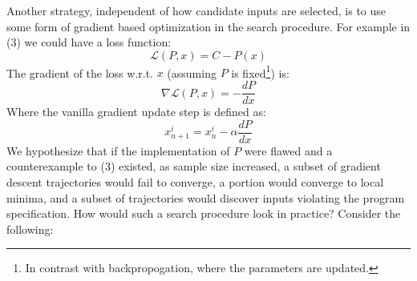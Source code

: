 \documentclass[12pt,initial,twoside,maitrise]{dms}
\numberwithin{equation}{section}
\numberwithin{table}{chapter}
\numberwithin{figure}{chapter}
\begin{document}
    Another strategy, independent of how candidate inputs are selected, is to use some form of gradient based optimization in the search procedure. For example in (3) we could have a loss function:
    \begin{equation}
        \mathcal{L}(P, x) = C - P(x)
    \end{equation}
    The gradient of the loss w.r.t. $x$ (assuming $P$ is fixed\footnote{In contrast with backpropogation, where the parameters are updated.}) is:
    \begin{equation}
        \nabla \mathcal{L}(P, x) = - \frac{dP}{dx}
    \end{equation}
    Where the vanilla gradient update step is defined as:
    \begin{equation}
        x_{n+1}^i=x_{n}^i - \alpha\frac{dP}{dx}
    \end{equation}
    We hypothesize that if the implementation of $P$ were flawed and a counterexample to (3) existed, as sample size increased, a subset of gradient descent trajectories would fail to converge, a portion would converge to local minima, and a subset of trajectories would discover inputs violating the program specification. How would such a search procedure look in practice? Consider the following:

\end{document}

